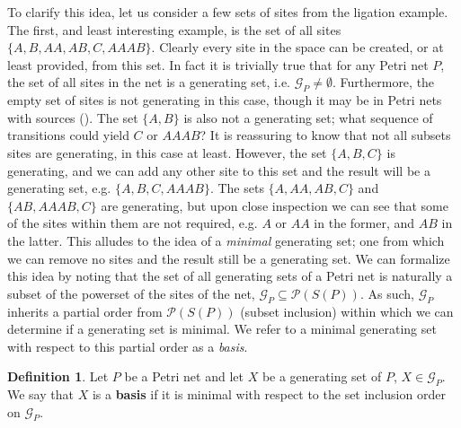 \documentclass[aps,prd,onecolumn,nofootinbib,letterpaper,preprintnumbers,superscriptaddress,eqsecnum]{revtex4}
\theoremstyle{definition}
\newtheorem{definition}{Definition}
\newcommand{\G}{\mathcal{G}}
\newcommand{\powerset}{\mathcal{P}}
\begin{document}
To clarify this idea, let us consider a few sets of sites from the ligation example.
The first, and least interesting example, is the set of all sites $\{A, B, AA, AB, C, AAAB\}$.
Clearly every site in the space can be created, or at least provided, from this set.
In fact it is trivially true that for any Petri net $P$, the set of all sites in the net is a generating set, i.e. $\G_P \ne \emptyset$.
Furthermore, the empty set of sites is not generating in this case, though it may be in Petri nets with sources ().
The set $\{A,B\}$ is also not a generating set; what sequence of transitions could yield $C$ or $AAAB$?
It is reassuring to know that not all subsets sites are generating, in this case at least.
However, the set $\{A,B,C\}$ is generating, and we can add any other site to this set and the result will be a generating set, e.g. $\{A,B,C,AAAB\}$.
The sets $\{A, AA, AB, C\}$ and $\{AB, AAAB, C\}$ are generating, but upon close inspection we can see that some of the sites within them are not required, e.g. $A$ or $AA$ in the former, and $AB$ in the latter.
This alludes to the idea of a \textit{minimal} generating set; one from which we can remove no sites and the result still be a generating set.
We can formalize this idea by noting that the set of all generating sets of a Petri net is naturally a subset of the powerset of the sites of the net, $\G_P \subseteq \powerset(S(P))$.
As such, $\G_P$ inherits a partial order from $\powerset(S(P))$ (subset inclusion) within which we can determine if a generating set is minimal.
We refer to a minimal generating set with respect to this partial order as a \textit{basis}.

\begin{definition}\label{def:basis}
    Let $P$ be a Petri net and let $X$ be a generating set of $P$, $X \in \G_P$.
    We say that $X$ is a \textbf{basis} if it is minimal with respect to the set inclusion order on $\G_P$.
\end{definition}
\end{document}
